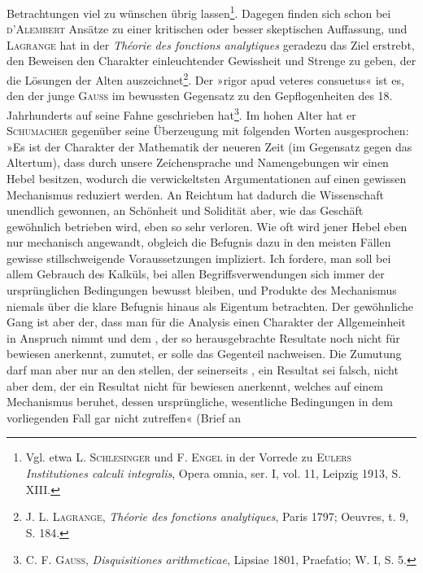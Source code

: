 Betrachtungen viel zu wünschen übrig lassen\footnote{Vgl. etwa L. \textsc{Schlesinger} und F. \textsc{Engel} in der Vorrede zu \textsc{Eulers} \textit{Institutiones calculi integralis}, Opera omnia, ser. I, vol. 11, Leipzig 1913, S. XIII.}.
Dagegen finden sich
schon bei \textsc{d'Alembert} Ansätze zu einer kritischen oder besser skeptischen
Auffassung, und \textsc{Lagrange} hat in der \textit{Théorie des fonctions analytiques} geradezu
das Ziel erstrebt, den Beweisen den Charakter einleuchtender Gewissheit und
Strenge zu geben, der die Lösungen der Alten auszeichnet\footnote{J. L. \textsc{Lagrange}, \textit{Théorie des fonctions analytiques}, Paris 1797; Oeuvres, t. 9, S. 184.}.
Der »rigor apud
veteres consuetus« ist es, den der junge \textsc{Gauss} im bewussten Gegensatz zu
den Gepflogenheiten des 18. Jahrhunderts auf seine Fahne geschrieben hat\footnote{C. F. \textsc{Gauss}, \textit{Disquisitiones arithmeticae}, Lipsiae 1801, Praefatio; W. I, S. 5.}.
Im hohen Alter hat er \textsc{Schumacher} gegenüber seine Überzeugung mit folgenden
\clearpage{}\HistoricalFoot{}{2\textsuperscript{*}}
\noindent Worten ausgesprochen: »Es ist der Charakter der Mathematik der neueren
Zeit (im Gegensatz gegen das Altertum), dass durch unsere Zeichensprache
und Namengebungen wir einen Hebel besitzen, wodurch die verwickeltsten
Argumentationen auf einen gewissen Mechanismus reduziert werden. An
Reichtum hat dadurch die Wissenschaft unendlich gewonnen, an Schönheit
und Solidität aber, wie das Geschäft gewöhnlich betrieben wird, eben so sehr
verloren. Wie oft wird jener Hebel eben nur mechanisch angewandt, obgleich
die Befugnis dazu in den meisten Fällen gewisse stillschweigende Voraussetzungen
impliziert. Ich fordere, man soll bei allem Gebrauch des Kalküls,
bei allen Begriffsverwendungen sich immer der ursprünglichen Bedingungen
bewusst bleiben, und  Produkte des Mechanismus niemals über die klare
Befugnis hinaus als Eigentum betrachten. Der gewöhnliche Gang ist aber
der, dass man für die Analysis einen Charakter der Allgemeinheit in Anspruch
nimmt und dem , der so herausgebrachte Resultate noch nicht für
bewiesen anerkennt, zumutet, er solle das Gegenteil nachweisen. Die Zumutung
darf man aber nur an den stellen, der seinerseits , ein
Resultat sei falsch, nicht aber dem, der ein Resultat nicht für bewiesen anerkennt,
welches auf einem Mechanismus beruhet, dessen ursprüngliche, wesentliche
Bedingungen in dem vorliegenden Fall gar nicht zutreffen« (Brief an
